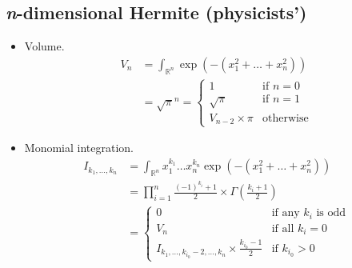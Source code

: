 \documentclass[draft]{scrartcl}
\begin{document}
\subsection*{\textit{n}-dimensional Hermite (physicists')}
\begin{itemize}
  \item Volume.
\[
  \begin{split}
  V_n
  &= \int_{\mathbb{R}^n} \exp\left(-(x_1^2+\dots+x_n^2)\right)\\
  &= \sqrt{\pi}^n
   = \begin{cases}
     1&\text{if $n=0$}\\
     \sqrt{\pi}&\text{if $n=1$}\\
     V_{n-2} \times \pi&\text{otherwise}
   \end{cases}
  \end{split}
\]

  \item Monomial integration.
  \[
    \begin{split}
    I_{k_1,\dots,k_n}
    &= \int_{\mathbb{R}^n} x_1^{k_1}\dots x_n^{k_n} \exp(-(x_1^2+\dots+x_n^2))\\
    &= \prod_{i=1}^n \frac{(-1)^{k_i} + 1}{2} \times \Gamma\left(\frac{k_i+1}{2}\right)\\
    &=\begin{cases}
      0&\text{if any $k_i$ is odd}\\
      V_n&\text{if all $k_i=0$}\\
      I_{k_1,\dots,k_{i_0}-2,\dots,k_n} \times \frac{k_{i_0} - 1}{2}&\text{if $k_{i_0} > 0$}
    \end{cases}
    \end{split}
  \]
\end{itemize}
\end{document}
